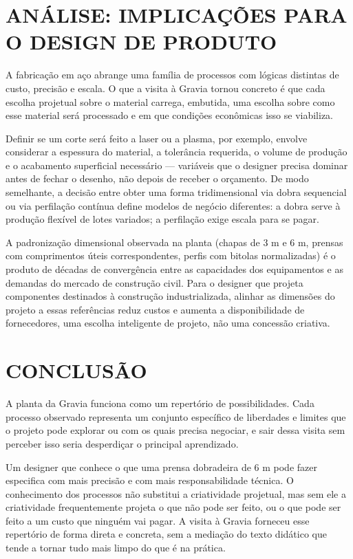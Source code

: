 \documentclass[12pt,a4paper,oneside,brazil,chapter=TITLE]{article}
\newcommand{\secbreak}{\clearpage}
\let\oldsection\section
\renewcommand{\section}{\secbreak\oldsection}
\begin{document}
\section{ANÁLISE: IMPLICAÇÕES PARA O DESIGN DE PRODUTO}

A fabricação em aço abrange uma família de processos com lógicas distintas de custo, precisão e escala. O que a visita à Gravia tornou concreto é que cada escolha projetual sobre o material carrega, embutida, uma escolha sobre como esse material será processado e em que condições econômicas isso se viabiliza.

Definir se um corte será feito a laser ou a plasma, por exemplo, envolve considerar a espessura do material, a tolerância requerida, o volume de produção e o acabamento superficial necessário — variáveis que o designer precisa dominar antes de fechar o desenho, não depois de receber o orçamento. De modo semelhante, a decisão entre obter uma forma tridimensional via dobra sequencial ou via perfilação contínua define modelos de negócio diferentes: a dobra serve à produção flexível de lotes variados; a perfilação exige escala para se pagar.

A padronização dimensional observada na planta (chapas de 3 m e 6 m, prensas com comprimentos úteis correspondentes, perfis com bitolas normalizadas) é o produto de décadas de convergência entre as capacidades dos equipamentos e as demandas do mercado de construção civil. Para o designer que projeta componentes destinados à construção industrializada, alinhar as dimensões do projeto a essas referências reduz custos e aumenta a disponibilidade de fornecedores, uma escolha inteligente de projeto, não uma concessão criativa.

\section{CONCLUSÃO}

A planta da Gravia funciona como um repertório de possibilidades. Cada processo observado representa um conjunto específico de liberdades e limites que o projeto pode explorar ou com os quais precisa negociar, e sair dessa visita sem perceber isso seria desperdiçar o principal aprendizado.

Um designer que conhece o que uma prensa dobradeira de 6 m pode fazer especifica com mais precisão e com mais responsabilidade técnica. O conhecimento dos processos não substitui a criatividade projetual, mas sem ele a criatividade frequentemente projeta o que não pode ser feito, ou o que pode ser feito a um custo que ninguém vai pagar. A visita à Gravia forneceu esse repertório de forma direta e concreta, sem a mediação do texto didático que tende a tornar tudo mais limpo do que é na prática.
\end{document}
